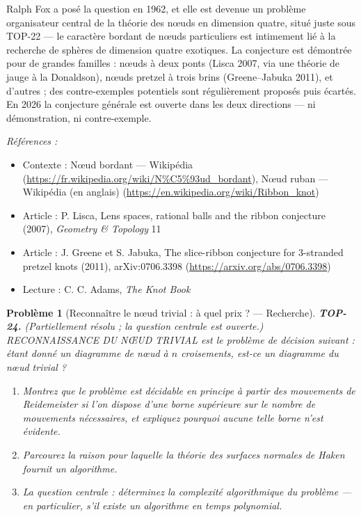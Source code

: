 \documentclass[11pt]{article}
\newtheorem{problem}{Problème}
\newenvironment{refs}{\par\small\noindent\emph{Références :}\begin{itemize}\setlength\itemsep{0pt}}{\end{itemize}\normalsize}
\begin{document}
\noindent Ralph Fox a posé la question en 1962, et elle est devenue un problème organisateur
central de la théorie des n\oe{}uds en dimension quatre, situé juste sous TOP-22 --- le caractère bordant de
n\oe{}uds particuliers est intimement lié à la recherche de sphères de dimension quatre exotiques. La
conjecture est démontrée pour de grandes familles : n\oe{}uds à deux ponts (Lisca 2007, via une théorie de
jauge à la Donaldson), n\oe{}uds pretzel à trois brins (Greene--Jabuka 2011), et d'autres ; des
contre-exemples potentiels sont régulièrement proposés puis écartés. En 2026 la conjecture générale est
ouverte dans les deux directions --- ni démonstration, ni contre-exemple.

\begin{refs}
\item Contexte : N\oe{}ud bordant --- Wikipédia (\url{https://fr.wikipedia.org/wiki/N%C5%93ud_bordant}), N\oe{}ud ruban --- Wikipédia (en anglais) (\url{https://en.wikipedia.org/wiki/Ribbon_knot})
\item Article : P. Lisca, \og{} Lens spaces, rational balls and the ribbon conjecture \fg{} (2007), \textit{Geometry \& Topology} 11
\item Article : J. Greene et S. Jabuka, \og{} The slice-ribbon conjecture for 3-stranded pretzel knots \fg{} (2011), arXiv:0706.3398 (\url{https://arxiv.org/abs/0706.3398})
\item Lecture : C. C. Adams, \textit{The Knot Book}
\end{refs}

\bigskip

\begin{problem}[{Reconnaître le n\oe{}ud trivial : à quel prix ? --- Recherche}]
\textbf{TOP-24.} (Partiellement résolu ; la question centrale est ouverte.) RECONNAISSANCE DU N\OE{}UD
TRIVIAL est le problème de décision suivant : étant donné un diagramme de n\oe{}ud à $ n $ croisements,
est-ce un diagramme du n\oe{}ud trivial ?
\begin{enumerate}
\item[(a)] Montrez que le problème est décidable en principe à partir des mouvements de Reidemeister
\textit{si l'on dispose} d'une borne supérieure sur le nombre de mouvements nécessaires, et expliquez
pourquoi aucune telle borne n'est évidente.
\item[(b)] Parcourez la raison pour laquelle la théorie des surfaces normales de Haken fournit un
algorithme.
\item[(c)] La question centrale : déterminez la complexité algorithmique du problème --- en particulier, s'il
existe un algorithme en temps polynomial.
\end{enumerate}

\end{problem}
\end{document}

